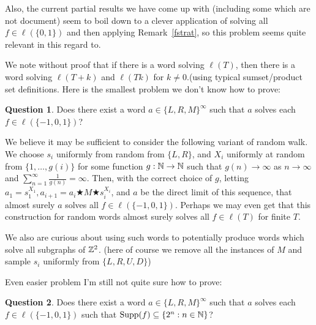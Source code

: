 \documentclass[a4paper]{article}
\DeclareMathOperator{\supp}{Supp}
\theoremstyle{definition}
\newtheorem*{que}{Question}
\begin{document}
Also, the current partial results we have come up with (including some which are not document) seem to boil down to a clever application of solving all $f\in \ell(\{0,1\})$ and then applying Remark~\ref{fstrat}, so this problem seems quite relevant in this regard to. 

We note without proof that if there is a word solving $\ell(T)$, then there is a word solving $\ell(T+k)$ and $\ell(Tk)$ for $k \neq 0$.(using typical sumset/product set definitions. Here is the smallest problem we don't know how to prove:

\begin{que}
    Does there exist a word $a \in \{L,R,M\}^\infty$ such that $a$ solves each $f \in \ell(\{-1,0,1\})$?
\end{que}

We believe it may be sufficient to consider the following variant of random walk. We choose $s_i$ uniformly from random from $\{L,R\}$, and $X_i$ uniformly at random from $\{1, \dots , g(i)\}$ for some function $g:\Bbb{N} \to \Bbb{N}$ such that $g(n)\to \infty$ as $n\to \infty$ and $\sum_{n=1}^\infty \frac{1}{g(n)} = \infty$. Then, with the correct choice of $g$, letting $a_1 = s_1^{X_1}, a_{i+1} = a_i\bigstar M\bigstar s_i^{X_i}$, and $a$ be the direct limit of this sequence, that almost surely $a$ solves all $f \in \ell(\{-1,0,1\})$. Perhaps we may even get that this construction for random words almost surely solves all $f \in \ell(T)$ for finite $T$.

We also are curious about using such words to potentially produce words which solve all subgraphs of $\Bbb{Z}^2$. (here of course we remove all the instances of $M$ and sample $s_i$ uniformly from $\{L,R,U,D\}$)

Even easier problem I'm still not quite sure how to prove:

\begin{que}
    Does there exist a word $a \in \{L,R,M\}^\infty$ such that $a$ solves each $f \in \ell(\{-1,0,1\})$ such that $\supp(f)\subseteq \{2^n:n \in \Bbb{N}\}$?
\end{que}
\end{document}
